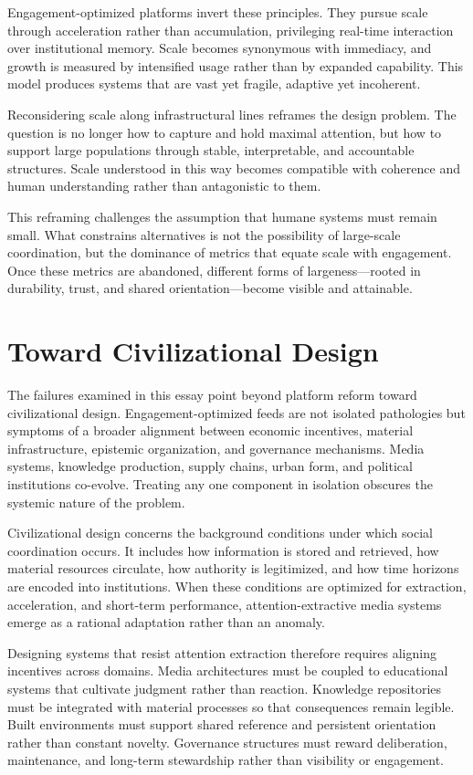 \documentclass[12pt]{article}
\begin{document}
Engagement-optimized platforms invert these principles. They pursue scale through acceleration rather than accumulation, privileging real-time interaction over institutional memory. Scale becomes synonymous with immediacy, and growth is measured by intensified usage rather than by expanded capability. This model produces systems that are vast yet fragile, adaptive yet incoherent.

Reconsidering scale along infrastructural lines reframes the design problem. The question is no longer how to capture and hold maximal attention, but how to support large populations through stable, interpretable, and accountable structures. Scale understood in this way becomes compatible with coherence and human understanding rather than antagonistic to them.

This reframing challenges the assumption that humane systems must remain small. What constrains alternatives is not the possibility of large-scale coordination, but the dominance of metrics that equate scale with engagement. Once these metrics are abandoned, different forms of largeness—rooted in durability, trust, and shared orientation—become visible and attainable.

\section{Toward Civilizational Design}

The failures examined in this essay point beyond platform reform toward civilizational design. Engagement-optimized feeds are not isolated pathologies but symptoms of a broader alignment between economic incentives, material infrastructure, epistemic organization, and governance mechanisms. Media systems, knowledge production, supply chains, urban form, and political institutions co-evolve. Treating any one component in isolation obscures the systemic nature of the problem.

Civilizational design concerns the background conditions under which social coordination occurs. It includes how information is stored and retrieved, how material resources circulate, how authority is legitimized, and how time horizons are encoded into institutions. When these conditions are optimized for extraction, acceleration, and short-term performance, attention-extractive media systems emerge as a rational adaptation rather than an anomaly.

Designing systems that resist attention extraction therefore requires aligning incentives across domains. Media architectures must be coupled to educational systems that cultivate judgment rather than reaction. Knowledge repositories must be integrated with material processes so that consequences remain legible. Built environments must support shared reference and persistent orientation rather than constant novelty. Governance structures must reward deliberation, maintenance, and long-term stewardship rather than visibility or engagement.
\end{document}
